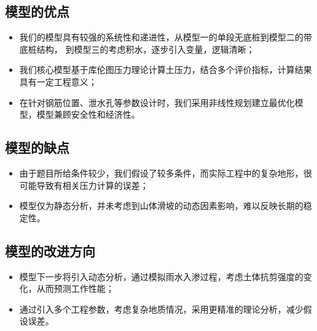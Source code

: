\documentclass[withoutpreface,bwprint]{cumcmthesis}
\begin{document}
\subsection{模型的优点}
\begin{itemize}[itemindent=2em]
\item 我们的模型具有较强的系统性和递进性，从模型一的单段无底桩到模型二的带底桩结构，
到模型三的考虑积水，逐步引入变量，逻辑清晰；
\item 我们核心模型基于库伦图压力理论计算土压力，结合多个评价指标，计算结果具有一定工程意义；
\item 在针对钢筋位置、泄水孔等参数设计时，我们采用非线性规划建立最优化模型，模型兼顾安全性和经济性。
\end{itemize}

\subsection{模型的缺点}
\begin{itemize}[itemindent=2em]
\item 由于题目所给条件较少，我们假设了较多条件，而实际工程中的复杂地形，很可能导致有相关压力计算的误差；
\item 模型仅为静态分析，并未考虑到山体滑坡的动态因素影响，难以反映长期的稳定性。
\end{itemize}

\subsection{模型的改进方向}
\begin{itemize}[itemindent=2em]
\item 模型下一步将引入动态分析，通过模拟雨水入渗过程，考虑土体抗剪强度的变化，从而预测工作性能；
\item 通过引入多个工程参数，考虑复杂地质情况，采用更精准的理论分析，减少假设误差。
\end{itemize}
\nocite{*}
\end{document}
